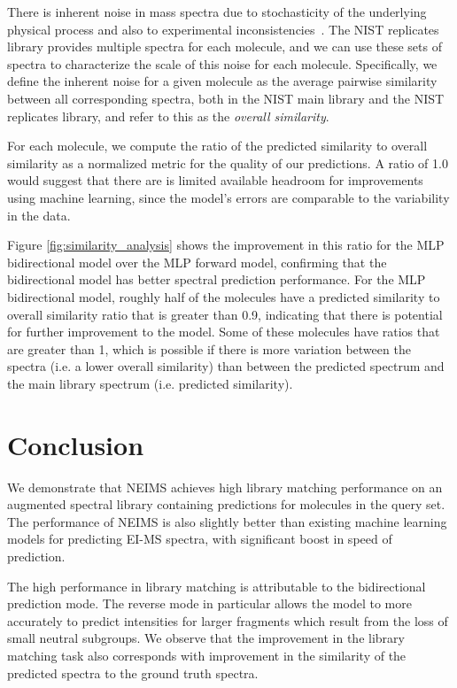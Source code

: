 There is inherent noise in mass spectra due to stochasticity of the underlying physical process and also to experimental inconsistencies~\cite{stein2012MassLibReview}. The NIST replicates library provides multiple spectra for each molecule, and we can use these sets of spectra to characterize the scale of this noise for each molecule. Specifically, we define the inherent noise for a given molecule as the average pairwise similarity between all corresponding spectra, both in the NIST main library and the NIST replicates library, and refer to this as the \textit{overall similarity}.

For each molecule, we compute the ratio of the predicted similarity to overall similarity as a normalized metric for the quality of our predictions. A ratio of 1.0 would suggest that there are is limited available headroom for improvements using machine learning, since the model's errors are comparable to the variability in the data.

Figure \ref{fig:similarity_analysis} shows the improvement in this ratio for the MLP bidirectional model over the MLP forward model, confirming that the bidirectional model has better spectral prediction performance. For the MLP bidirectional model, roughly half of the molecules have a predicted similarity to overall similarity ratio that is greater than 0.9, indicating that there is potential for further improvement to the model. Some of these molecules have ratios that are greater than 1, which is possible if there is more variation between the spectra (i.e. a lower overall similarity) than between the predicted spectrum and the main library spectrum (i.e. predicted similarity).

\section{Conclusion}

We demonstrate that NEIMS achieves high library matching performance on an augmented spectral library containing predictions for molecules in the query set.
The performance of NEIMS is also slightly better than existing machine learning models for predicting EI-MS spectra, with significant boost in speed of prediction.

The high performance in library matching is attributable to the bidirectional prediction mode. The reverse mode in particular allows the model to more accurately to predict intensities for larger fragments which result from the loss of small neutral subgroups. We observe that the improvement in the library matching task also corresponds with improvement in the similarity of the predicted spectra to the ground truth spectra.

